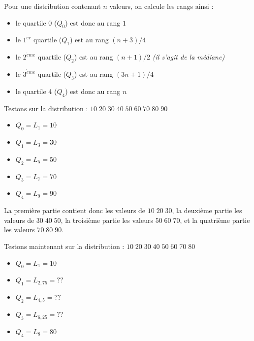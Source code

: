 \documentclass[11pt,a4paper]{article}
\begin{document}
\bigskip

Pour une distribution contenant $ n $ valeurs, on calcule les rangs ainsi :

\begin{itemize}
\item le quartile 0 ($Q_{0}$) est donc au rang $ 1 $
\item le $ 1^{er} $ quartile ($Q_{1}$) est au rang $ (n + 3) / 4 $
\item le $ 2^{\grave{e}me} $ quartile ($Q_{2}$) est au rang $ (n + 1) / 2 $ \textit{(il s'agit de la médiane)}
\item le $ 3^{\grave{e}me} $ quartile ($Q_{3}$) est au rang $ (3n + 1) / 4 $
\item le quartile 4 ($Q_{4}$) est donc au rang $ n $
\end{itemize}

\bigskip

Testons sur la distribution : $ 10 \; 20 \; 30 \; 40 \; 50 \; 60 \; 70 \; 80 \; 90 $

\begin{itemize}
\item $ Q_{0} = L_{1} = 10 $
\item $ Q_{1} = L_{3} = 30 $
\item $ Q_{2} = L_{5} = 50 $
\item $ Q_{3} = L_{7} = 70 $
\item $ Q_{4} = L_{9} = 90 $
\end{itemize}

\bigskip

La première partie contient donc les valeurs de $ 10 \; 20 \; 30 $, la deuxième partie les valeurs de $ 30 \; 40 \; 50 $, la troisième partie les valeurs $ 50 \; 60 \; 70 $, et la quatrième partie les valeurs $ 70 \; 80 \; 90 $.


\bigskip
\bigskip

Testons maintenant sur la distribution : $ 10 \; 20 \; 30 \; 40 \; 50 \; 60 \; 70 \; 80 $

\begin{itemize}
\item $ Q_{0} = L_{1} = 10 $
\item $ Q_{1} = L_{2,75} = ?? $
\item $ Q_{2} = L_{4,5}  = ?? $
\item $ Q_{3} = L_{6,25} = ?? $
\item $ Q_{4} = L_{8} = 80 $
\end{itemize}

\bigskip
\end{document}
